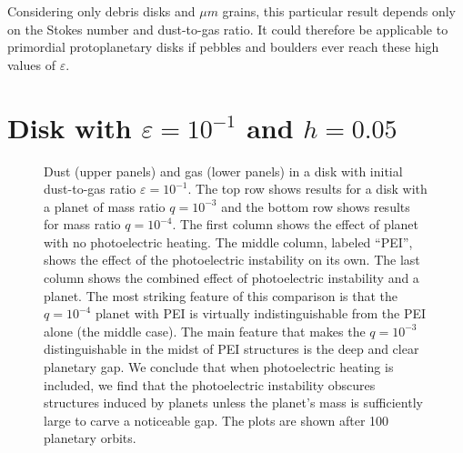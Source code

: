 \documentclass[onecolumn]{report}
\newcommand{\epsi}{\varepsilon}
\begin{document}
Considering only debris disks and $\mu m$ grains, this particular result depends only on the Stokes number and dust-to-gas ratio. It could therefore be applicable to primordial protoplanetary disks if pebbles and boulders ever reach these high values of $\epsi$.

\section{Disk with $\epsi=10^{-1}$ and $h=0.05$}

\begin{figure}
  \begin{center}
  \end{center}
  \caption{Dust (upper panels) and gas (lower panels) in
    a disk with initial dust-to-gas ratio $\varepsilon=10^{-1}$. The top row shows results for a disk with a planet of mass ratio $q=10^{-3}$ and the bottom row shows results for mass ratio $q=10^{-4}$. The first column shows the effect of planet with no photoelectric heating. The middle column, labeled ``PEI'', shows the effect of the photoelectric instability on its own. The last column shows the combined effect of photoelectric instability and a planet. The most striking feature of this comparison is that the $q=10^{-4}$ planet with PEI is virtually indistinguishable from the PEI alone (the middle case). The main feature that makes the $q=10^{-3}$ distinguishable in the midst of PEI structures is the deep and clear planetary gap. We conclude that when photoelectric heating is included, we find that the photoelectric instability obscures structures induced by planets unless the planet's mass is sufficiently large to carve a noticeable gap. The plots are shown after 100 planetary orbits.}

\end{figure}
\end{document}
